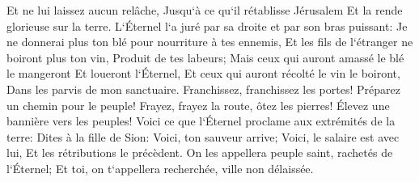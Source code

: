 \verse Et ne lui laissez aucun relâche, Jusqu`à ce qu`il rétablisse Jérusalem Et la rende glorieuse sur la terre. 
\verse L`Éternel l`a juré par sa droite et par son bras puissant: Je ne donnerai plus ton blé pour nourriture à tes ennemis, Et les fils de l`étranger ne boiront plus ton vin, Produit de tes labeurs; 
\verse Mais ceux qui auront amassé le blé le mangeront Et loueront l`Éternel, Et ceux qui auront récolté le vin le boiront, Dans les parvis de mon sanctuaire. 
\verse Franchissez, franchissez les portes! Préparez un chemin pour le peuple! Frayez, frayez la route, ôtez les pierres! Élevez une bannière vers les peuples! 
\verse Voici ce que l`Éternel proclame aux extrémités de la terre: Dites à la fille de Sion: Voici, ton sauveur arrive; Voici, le salaire est avec lui, Et les rétributions le précèdent. 
\verse On les appellera peuple saint, rachetés de l`Éternel; Et toi, on t`appellera recherchée, ville non délaissée. 

\chapter{}

